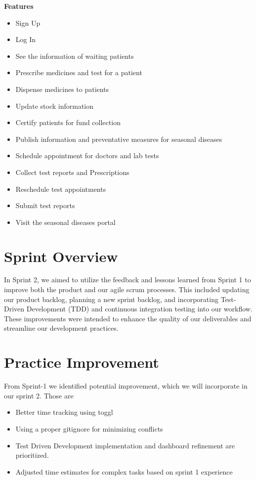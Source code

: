 \documentclass[a4paper,12pt]{article}
\begin{document}
\textbf{Features}
\begin{itemize}
    \item Sign Up
    \item Log In
    \item See the information of waiting patients
    \item Prescribe medicines and test for a patient
    \item Dispense medicines to patients
    \item Update stock information
    \item Certify patients for fund collection
    \item Publish information and preventative measures for seasonal diseases
    \item Schedule appointment for doctors and lab tests
    \item Collect test reports and Prescriptions
    \item Reschedule test appointments
    \item Submit test reports
    \item Visit the seasonal diseases portal
\end{itemize}
\section{Sprint Overview}
In Sprint 2, we aimed to utilize the feedback and lessons learned from Sprint 1 to improve both the product
and our agile scrum processes. This included updating our product backlog, planning a new sprint backlog, and
incorporating Test-Driven Development (TDD) and continuous integration testing into our workflow. These
improvements were intended to enhance the quality of our deliverables and streamline our development
practices.
\section{Practice Improvement}
From Sprint-1 we identified potential improvement, which we will incorporate in our sprint 2. Those are
\begin{itemize}
    \item Better time tracking using toggl
    \item Using a proper gitignore for minimizing conflicts 
    \item Test Driven Development implementation and dashboard refinement are prioritized.
    \item Adjusted time estimates for complex tasks based on sprint 1 experience
\end{itemize}
\end{document}
